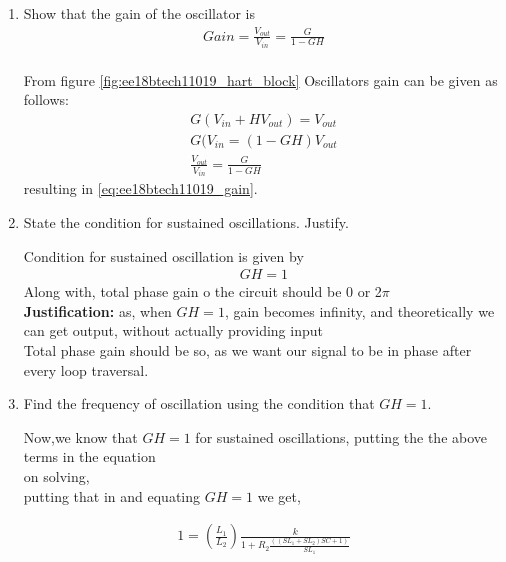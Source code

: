 \begin{enumerate}[label=\thesection.\arabic*.,ref=\thesection.\theenumi]
\item Show that the gain of the oscillator is \\
\begin{align}
    Gain  = \frac{V_{out}}{V_{in}} = \frac{G}{1 - GH}
\label{eq:ee18btech11019_gain}
\end{align}
%
\\
\solution From figure \ref{fig:ee18btech11019_hart_block}
Oscillators gain can be given as follows:\\
\begin{align}
    G(V_{in} + HV_{out}) =V_{out}\\
    G(V_{in} = (1-GH)V_{out}\\
    \frac{V_{out}}{V_{in}} = \frac{G}{1 - GH}
\end{align}
%
resulting in \eqref{eq:ee18btech11019_gain}.\\



\item State the condition for sustained oscillations. Justify.

\solution Condition for sustained oscillation is given by\\
\begin{align}
    GH = 1
\end{align}
Along with, total phase gain o the circuit should be 0 or 2$\pi$\\
\textbf{Justification:} as, when $ GH =1 $, gain becomes infinity, and theoretically we can get output, without actually providing input\\
Total phase gain should be so, as we want our signal to be in phase after every loop traversal.\\



\item Find the frequency of oscillation using the condition that $GH = 1$.

\solution 
Now,we know that $GH = 1$ for sustained oscillations, putting the the above terms in the equation\\
on solving,\\
    
putting that in and equating $GH=1$ we get,

\begin{align}
    1 = (\frac{L_1}{L_2})\frac{k}{1 + R_2\frac{((SL_1 + SL_2)SC + 1)}{SL_1}}
\end{align}


\end{enumerate}
